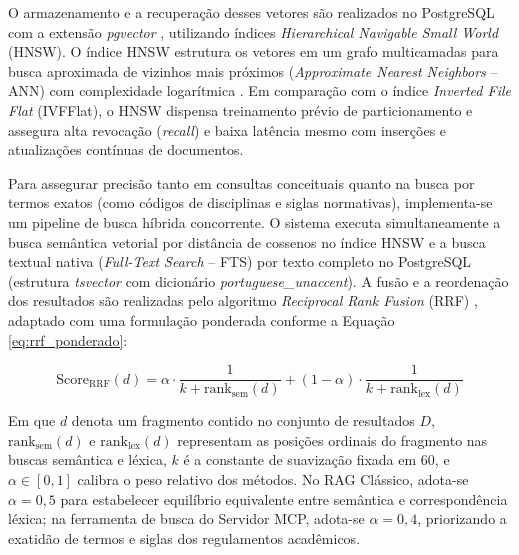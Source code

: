 \documentclass[12pt]{article}
\begin{document}
O armazenamento e a recuperação desses vetores são realizados no PostgreSQL com a extensão \textit{pgvector} \cite{pgvector2024}, utilizando índices \textit{Hierarchical Navigable Small World} (HNSW). O índice HNSW estrutura os vetores em um grafo multicamadas para busca aproximada de vizinhos mais próximos (\textit{Approximate Nearest Neighbors} -- ANN) com complexidade logarítmica \cite{johnson2017billion}. Em comparação com o índice \textit{Inverted File Flat} (IVFFlat), o HNSW dispensa treinamento prévio de particionamento e assegura alta revocação (\textit{recall}) e baixa latência mesmo com inserções e atualizações contínuas de documentos.

Para assegurar precisão tanto em consultas conceituais quanto na busca por termos exatos (como códigos de disciplinas e siglas normativas), implementa-se um pipeline de busca híbrida concorrente. O sistema executa simultaneamente a busca semântica vetorial por distância de cossenos no índice HNSW e a busca textual nativa (\textit{Full-Text Search} -- FTS) por texto completo no PostgreSQL (estrutura \textit{tsvector} com dicionário \textit{portuguese\_unaccent}). A fusão e a reordenação dos resultados são realizadas pelo algoritmo \textit{Reciprocal Rank Fusion} (RRF) \cite{cormack2009reciprocal}, adaptado com uma formulação ponderada conforme a Equação \ref{eq:rrf_ponderado}:

\begin{equation}
\label{eq:rrf_ponderado}
\mathrm{Score}_{\mathrm{RRF}}(d) = \alpha \cdot \frac{1}{k + \mathrm{rank}_{\mathrm{sem}}(d)} + (1 - \alpha) \cdot \frac{1}{k + \mathrm{rank}_{\mathrm{lex}}(d)}
\end{equation}

Em que $d$ denota um fragmento contido no conjunto de resultados $D$, $\mathrm{rank}_{\mathrm{sem}}(d)$ e $\mathrm{rank}_{\mathrm{lex}}(d)$ representam as posições ordinais do fragmento nas buscas semântica e léxica, $k$ é a constante de suavização fixada em $60$, e $\alpha \in [0,1]$ calibra o peso relativo dos métodos. No RAG Clássico, adota-se $\alpha = 0,5$ para estabelecer equilíbrio equivalente entre semântica e correspondência léxica; na ferramenta de busca do Servidor MCP, adota-se $\alpha = 0,4$, priorizando a exatidão de termos e siglas dos regulamentos acadêmicos.
\end{document}
